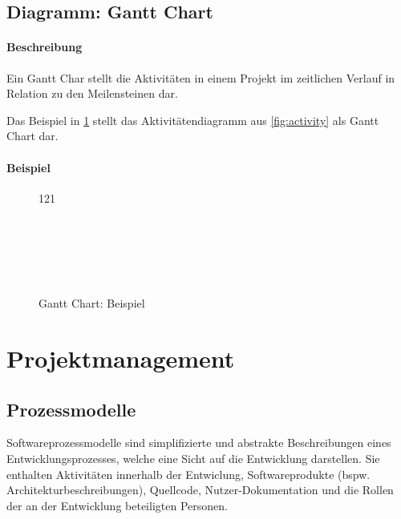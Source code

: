 		\subsection{Diagramm: Gantt Chart}
			\label{diagram:gantt}
			
			\paragraph{Beschreibung}
				Ein Gantt Char stellt die Aktivitäten in einem Projekt im zeitlichen Verlauf in Relation zu den Meilensteinen dar.
				
				Das Beispiel in \ref{fig:gantt} stellt das Aktivitätendiagramm aus \ref{fig:activity} als Gantt Chart dar.
			
			\paragraph{Beispiel}
				\begin{figure}[ht]
					\centering
					\begin{ganttchart}[
						title/.append style={fill=\thepagecolor},
						bar/.append style={fill=\thepagecolor},
						canvas/.append style={fill=\thepagecolor},
						vgrid,
						]{1}{21}
						\\
						 \\
						 \\
						 \\
						 \\
						 \\
					\end{ganttchart}
					\caption{Gantt Chart: Beispiel}
					\label{fig:gantt}
				\end{figure}

	\section{Projektmanagement}
		\subsection{Prozessmodelle}
			Softwareprozessmodelle sind simplifizierte und abstrakte Beschreibungen eines Entwicklungsprozesses, welche eine Sicht auf die Entwicklung darstellen. Sie enthalten Aktivitäten innerhalb der Entwiclung, Softwareprodukte (bspw. Architekturbeschreibungen), Quellcode, Nutzer-Dokumentation und die Rollen der an der Entwicklung beteiligten Personen.
			
